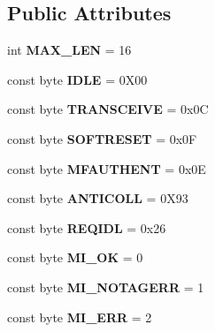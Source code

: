\subsection*{Public Attributes}
\begin{DoxyCompactItemize}
\item 
int {\bfseries M\+A\+X\+\_\+\+L\+EN} = 16\hypertarget{classmfrc522_ab5aeddf4462b8cbd6d4979a5aa591e2a}{}\label{classmfrc522_ab5aeddf4462b8cbd6d4979a5aa591e2a}

\item 
const byte {\bfseries I\+D\+LE} = 0\+X00\hypertarget{classmfrc522_a2db7d04e72f02ce2cd1d2f3c2a142d9b}{}\label{classmfrc522_a2db7d04e72f02ce2cd1d2f3c2a142d9b}

\item 
const byte {\bfseries T\+R\+A\+N\+S\+C\+E\+I\+VE} = 0x0C\hypertarget{classmfrc522_a4265ed9beb2068796f558866ecb7d599}{}\label{classmfrc522_a4265ed9beb2068796f558866ecb7d599}

\item 
const byte {\bfseries S\+O\+F\+T\+R\+E\+S\+ET} = 0x0F\hypertarget{classmfrc522_a5636b5a1e9382e1cc842fa20723d63bb}{}\label{classmfrc522_a5636b5a1e9382e1cc842fa20723d63bb}

\item 
const byte {\bfseries M\+F\+A\+U\+T\+H\+E\+NT} = 0x0E\hypertarget{classmfrc522_a65673200cf51c637d3998187b747f642}{}\label{classmfrc522_a65673200cf51c637d3998187b747f642}

\item 
const byte {\bfseries A\+N\+T\+I\+C\+O\+LL} = 0\+X93\hypertarget{classmfrc522_a19f4e763eb734d352e9c0bf4694030b1}{}\label{classmfrc522_a19f4e763eb734d352e9c0bf4694030b1}

\item 
const byte {\bfseries R\+E\+Q\+I\+DL} = 0x26\hypertarget{classmfrc522_ad0ab76f65c6fff489ac36b763e588e17}{}\label{classmfrc522_ad0ab76f65c6fff489ac36b763e588e17}

\item 
const byte {\bfseries M\+I\+\_\+\+OK} = 0\hypertarget{classmfrc522_ae9691458db3d46de5632ef531c0a06bc}{}\label{classmfrc522_ae9691458db3d46de5632ef531c0a06bc}

\item 
const byte {\bfseries M\+I\+\_\+\+N\+O\+T\+A\+G\+E\+RR} = 1\hypertarget{classmfrc522_abcdae51991b17be0222a25c351f36c08}{}\label{classmfrc522_abcdae51991b17be0222a25c351f36c08}

\item 
const byte {\bfseries M\+I\+\_\+\+E\+RR} = 2\hypertarget{classmfrc522_a6a308a9c089dea6dbab9366fc939c313}{}\label{classmfrc522_a6a308a9c089dea6dbab9366fc939c313}


\end{DoxyCompactItemize}
